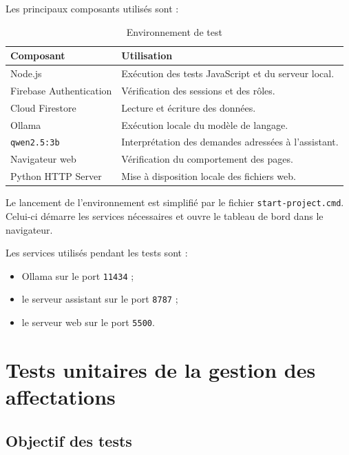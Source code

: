 \documentclass{rapportENSIAS}
\begin{document}
Les principaux composants utilisés sont :

\begin{table}[htbp]
    \centering
    \caption{Environnement de test}
    \label{tab:env-test}
    \begin{tabular}{|p{5cm}|p{8cm}|}
        \hline
        \textbf{Composant} & \textbf{Utilisation} \\
        \hline
        Node.js & Exécution des tests JavaScript et du serveur local. \\
        \hline
        Firebase Authentication & Vérification des sessions et des rôles. \\
        \hline
        Cloud Firestore & Lecture et écriture des données. \\
        \hline
        Ollama & Exécution locale du modèle de langage. \\
        \hline
        \texttt{qwen2.5:3b} & Interprétation des demandes adressées à l’assistant. \\
        \hline
        Navigateur web & Vérification du comportement des pages. \\
        \hline
        Python HTTP Server & Mise à disposition locale des fichiers web. \\
        \hline
    \end{tabular}
\end{table}

Le lancement de l’environnement est simplifié par le fichier \texttt{start-project.cmd}. Celui-ci démarre les services nécessaires et ouvre le tableau de bord dans le navigateur.

Les services utilisés pendant les tests sont :

\begin{itemize}
    \item Ollama sur le port \texttt{11434} ;
    \item le serveur assistant sur le port \texttt{8787} ;
    \item le serveur web sur le port \texttt{5500}.
\end{itemize}

\section{Tests unitaires de la gestion des affectations}

\subsection{Objectif des tests}
\end{document}
